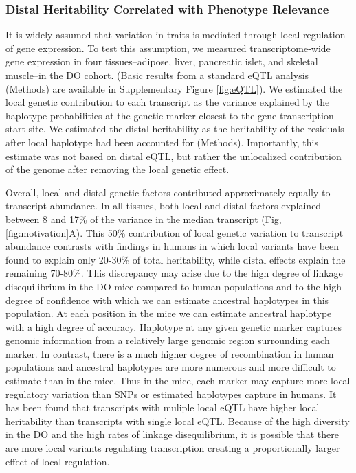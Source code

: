 \documentclass[
]{article}
\begin{document}
\subsubsection{Distal Heritability Correlated with Phenotype
Relevance}\label{distal-heritability-correlated-with-phenotype-relevance}

It is widely assumed that variation in traits is mediated through local
regulation of gene expression. To test this assumption, we measured
transcriptome-wide gene expression in four tissues--adipose, liver,
pancreatic islet, and skeletal muscle--in the DO cohort. (Basic results
from a standard eQTL analysis \cite{pmid30591514} (Methods) are
available in Supplementary Figure \ref{fig:eQTL}). We estimated the
local genetic contribution to each transcript as the variance explained
by the haplotype probabilities at the genetic marker closest to the gene
transcription start site. We estimated the distal heritability as the
heritability of the residuals after local haplotype had been accounted
for (Methods). Importantly, this estimate was not based on distal eQTL,
but rather the unlocalized contribution of the genome after removing the
local genetic effect.

Overall, local and distal genetic factors contributed approximately
equally to transcript abundance. In all tissues, both local and distal
factors explained between 8 and 17\% of the variance in the median
transcript (Fig, \ref{fig:motivation}A). This 50\% contribution of local
genetic variation to transcript abundance contrasts with findings in
humans in which local variants have been found to explain only 20-30\%
of total heritability, while distal effects explain the remaining
70-80\%\cite{pmid31558840, pmid21383966}. This discrepancy may arise due
to the high degree of linkage disequilibrium in the DO mice compared to
human populations and to the high degree of confidence with which we can
estimate ancestral haplotypes in this population. At each position in
the mice we can estimate ancestral haplotype with a high degree of
accuracy. Haplotype at any given genetic marker captures genomic
information from a relatively large genomic region surrounding each
marker. In contrast, there is a much higher degree of recombination in
human populations and ancestral haplotypes are more numerous and more
difficult to estimate than in the mice. Thus in the mice, each marker
may capture more local regulatory variation than SNPs or estimated
haplotypes capture in humans. It has been found that transcripts with
muliple local eQTL have higher local heritability than transcripts with
single local eQTL\cite{pmid25010687}. Because of the high diversity in
the DO and the high rates of linkage disequilibrium, it is possible that
there are more local variants regulating transcription creating a
proportionally larger effect of local regulation.
\end{document}
